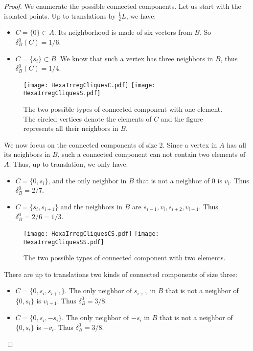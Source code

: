 \documentclass{amsart}                     %
\begin{document}
\begin{proof}
We enumerate the possible connected components. Let us start with the isolated points. Up to translations by $\frac{1}{2}L$, we have: 
\begin{itemize}
\item $C=\{0\}\subset A$.  Its neighborhood is made of six vectors from $B$. So $\delta_B^0(C)=1/6$.
\item $C=\{ s_i\}\subset B$.  We know that such a vertex has three neighbors in $B$, thus $\delta_B^0(C)=1/4$.
\end{itemize}

\begin{figure}[!ht]
\texttt{[image: HexaIrregCliquesC.pdf]} \hspace{10pt}
\texttt{[image: HexaIrregCliquesS.pdf]} 
\caption{The two possible types of connected component with one element. The circled vertices denote the elements of $C$ and the figure represents all their neighbors in $B$.\label{HexaIrregCC1}}
\end{figure}

We now focus on the connected components of size 2. Since a vertex in $A$ has all its neighbors in $B$, such a connected component can not contain two elements of $A$. Thus, up to translation, we only have: 
\begin{itemize}
\item  $C=\{0,s_i\}$, and the only neighbor in $B$ that is not a neighbor of $0$ is $v_i$. Thus $\delta^0_B=2/7$. 
\item $C=\{ s_i, s_{i+1} \}$ and the neighbors in $B$ are $s_{i-1},v_i,s_{i+2},v_{i+1}$. Thus $\delta^0_B=2/6=1/3$.
\end{itemize}

\begin{figure}[!ht]
\texttt{[image: HexaIrregCliquesCS.pdf]} \hspace{10pt}
\texttt{[image: HexaIrregCliquesSS.pdf]} 
\caption{The two possible types of connected component with two elements.\label{HexaIrregCC2}}
\end{figure}

There are up to translations two kinds of connected components of size three:

\begin{itemize}
\item $C= \{0,s_i,s_{i+1}\}$. The only neighbor of $s_{i+1}$ in $B$ that is not a neighbor of $\{0,s_i\}$ is $v_{i+1}$. Thus $\delta^0_B=3/8$.
\item $C= \{0,s_i,-s_{i}\}$. The only neighbor of $-s_{i}$ in $B$ that is not a neighbor of $\{0,s_i\}$ is $-v_{i}$. Thus $\delta^0_B=3/8$. 
\end{itemize}


\end{proof}
\end{document}

